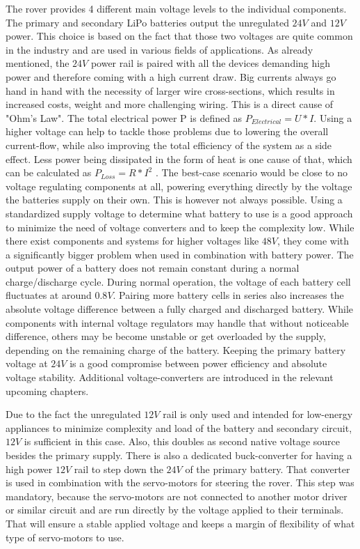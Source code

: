     The rover provides 4 different main voltage levels to the individual components. The primary and secondary LiPo batteries output the unregulated $24V$ and $12V$ power. This choice is based on the fact that those two voltages are quite common in the industry and are used in various fields of applications. As already mentioned, the $24V$ power rail is paired with all the devices demanding high power and therefore coming with a high current draw. Big currents always go hand in hand with the necessity of larger wire cross-sections, which results in increased costs, weight and more challenging wiring. This is a direct cause of "Ohm's Law". The total electrical power P is defined as $P_{Electrical}=U*I$. Using a higher voltage can help to tackle those problems due to lowering the overall current-flow, while also improving the total efficiency of the system as a side effect. Less power being dissipated in the form of heat is one cause of that, which can be calculated as $P_{Loss}=R*I^2$ . The best-case scenario would be close to no voltage regulating components at all, powering everything directly by the voltage the batteries supply on their own. This is however not always possible. Using a standardized supply voltage to determine what battery to use is a good approach to minimize the need of voltage converters and to keep the complexity low. While there exist components and systems for higher voltages like $48V$, they come with a significantly bigger problem when used in combination with battery power. The output power of a battery does not remain constant during a normal charge/discharge cycle. During normal operation, the voltage of each battery cell fluctuates at around $0.8V$. Pairing more battery cells in series also increases the absolute voltage difference between a fully charged and discharged battery. While components with internal voltage regulators may handle that without noticeable difference, others may be become unstable or get overloaded by the supply, depending on the remaining charge of the battery. Keeping the primary battery voltage at $24V$ is a good compromise between power efficiency and absolute voltage stability. Additional voltage-converters are introduced in the relevant upcoming chapters.

    \vspace{5mm} %

    Due to the fact the unregulated $12V$ rail is only used and intended for low-energy appliances to minimize complexity and load of the battery and secondary circuit, $12V$ is sufficient in this case. Also, this doubles as second native voltage source besides the primary supply. There is also a dedicated buck-converter for having a high power $12V$ rail to step down the $24V$ of the primary battery. That converter is used in combination with the servo-motors for steering the rover. This step was mandatory, because the servo-motors are not connected to another motor driver or similar circuit and are run directly by the voltage applied to their terminals. That will ensure a stable applied voltage and keeps a margin of flexibility of what type of servo-motors to use. 

